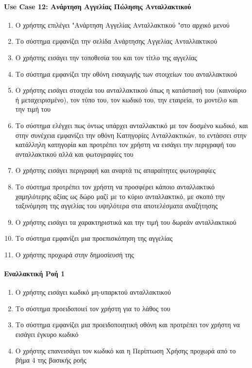 \documentclass{../ol-softwaremanual}
\begin{document}
	\paragraph{\en Use Case 12: \gr Ανάρτηση Αγγελίας Πώλησης Ανταλλακτικού \gr}
	
	\begin{enumerate}
		\item Ο χρήστης επιλέγει \en"\gr Ανάρτηση Αγγελίας Ανταλλακτικού \en"\gr στο αρχικό μενού
		\item Το σύστημα εμφανίζει την σελίδα Ανάρτησης Αγγελίας Ανταλλακτικού
		\item Ο χρήστης εισάγει την τοποθεσία του και τον τίτλο της αγγελίας
		\item Το σύστημα εμφανίζει την οθόνη εισαγωγής των στοιχείων του ανταλλακτικού
		\item Ο χρήστης εισάγει στοιχεία του ανταλλακτικού όπως η κατάστασή του (καινούριο ή μεταχειρισμένο), τον τύπο του, τον κωδικό του, την εταιρεία, το μοντέλο και την τιμή του
		\item Το σύστημα ελέγχει πως όντως υπάρχει ανταλλακτικό με τον δοσμένο κωδικό, και στην συνέχεια εμφανίζει την οθόνη Κατηγορίες Ανταλλακτικών, το εντάσσει στην κατάλληλη κατηγορία και προτρέπει τον χρήστη να εισάγει την περιγραφή του ανταλλακτικού αλλά και φωτογραφίες του
		\item Ο χρήστης εισάγει περιγραφή και αναρτά τις απαραίτητες φωτογραφίες
		\item Το σύστημα προτρέπει τον χρήστη να προσφέρει κάποιο ανταλλακτικό χαμηλότερης αξίας ως δώρο μαζί με το κύριο ανταλλακτικό, με σκοπό την ταξινόμηση της αγγελίας του υψηλότερα στα αποτελέσματα αναζήτησης
		\item Ο χρήστης εισάγει τα χαρακτηριστικά και την τιμή του δωρεάν ανταλλακτικού
		\item Το σύστημα εμφανίζει μια προεπισκόπηση της αγγελίας
		\item Ο χρήστης προχωρά στην δημοσίευσή της
	\end{enumerate}


	\paragraph{Εναλλακτική Ροή 1}
	
	\begin{enumerate}
		\item Ο χρήστης εισάγει κωδικό μη-υπαρκτού ανταλλακτικού
		\item Το σύστημα προειδοποιεί τον χρήστη για το λάθος του
		\item Το σύστημα εμφανίζει μια προειδοποιητική οθόνη και προτρέπει τον χρήστη να εισάγει έγκυρο κωδικό
		\item Ο χρήστης επανεισάγει τον κωδικό και η Περίπτωση Χρήσης προχωρά από το βήμα 4 της βασικής ροής
	\end{enumerate}
	
\end{document}
